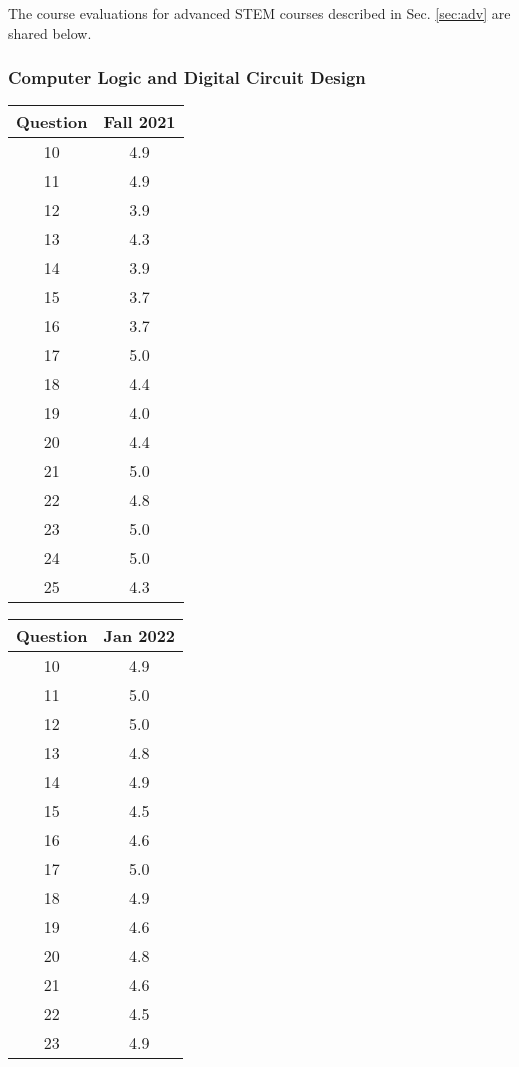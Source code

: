 \documentclass[../../main.tex]{subfiles}
\begin{document}
The course evaluations for advanced STEM courses described in Sec. \ref{sec:adv} are shared below.

\subsubsection{Computer Logic and Digital Circuit Design}

\begin{table}
\footnotesize
\centering
\begin{tabular}{| c | c |}
\hline
\hline
Question & Fall 2021 \\ \hline
10 & 4.9 \\ \hline
11 & 4.9 \\ \hline
12 & 3.9 \\ \hline
13 & 4.3 \\ \hline
14 & 3.9 \\ \hline
15 & 3.7 \\ \hline
16 & 3.7 \\ \hline
17 & 5.0 \\ \hline
18 & 4.4 \\ \hline
19 & 4.0 \\ \hline
20 & 4.4 \\ \hline
21 & 5.0 \\ \hline
22 & 4.8 \\ \hline
23 & 5.0 \\ \hline
24 & 5.0 \\ \hline
25 & 4.3 \\ \hline
\hline
\end{tabular}
\begin{tabular}{| c | c |}
\hline
\hline
Question & Jan 2022 \\ \hline
10 & 4.9 \\ \hline
11 & 5.0 \\ \hline
12 & 5.0 \\ \hline
13 & 4.8 \\ \hline
14 & 4.9 \\ \hline
15 & 4.5 \\ \hline
16 & 4.6 \\ \hline
17 & 5.0 \\ \hline
18 & 4.9 \\ \hline
19 & 4.6 \\ \hline
20 & 4.8 \\ \hline
21 & 4.6 \\ \hline
22 & 4.5 \\ \hline
23 & 4.9 \\ \hline

\end{tabular}
\end{table}
\end{document}
